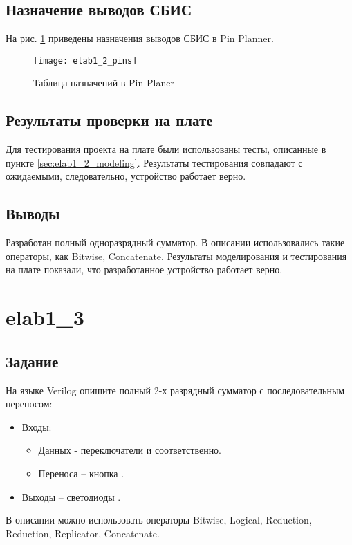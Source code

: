 \subsection{Назначение выводов СБИС}

На рис. \ref{fig:elab1_2_pins} приведены назначения выводов СБИС в Pin Planner.

\begin{figure}[H]
\begin{center}
	\texttt{[image: elab1\_2\_pins]}
	\caption{Таблица назначений в Pin Planer}
	\label{fig:elab1_2_pins}
\end{center}
\end{figure}

\subsection{Результаты проверки на плате}

Для тестирования проекта на плате были использованы тесты, описанные в пункте \ref{sec:elab1_2_modeling}. Результаты тестирования совпадают с ожидаемыми, следовательно, устройство работает верно.

\subsection{Выводы}

Разработан полный одноразрядный сумматор. В описании использовались такие операторы, как Bitwise, Concatenate. Результаты моделирования и тестирования на плате показали, что разработанное устройство работает верно.

\newpage

\section{elab1\_3}

\subsection{Задание}

На языке Verilog опишите полный 2-х разрядный сумматор с последовательным переносом:
\begin{itemize}
	\item Входы:
	\begin{itemize}
		\item Данных - переключатели  и  соответственно.
		\item Переноса – кнопка .
	\end{itemize}
	\item Выходы – светодиоды .
\end{itemize}
В описании можно использовать операторы Bitwise, Logical, Reduction, Reduction, Replicator, Concatenate.

